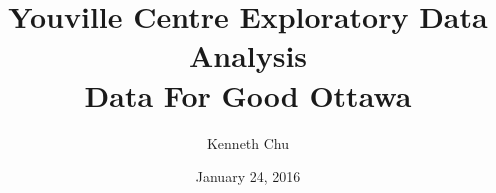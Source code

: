 \documentclass{beamer}
\title[Data for Good 2016-01-24]{
\mbox{}\vskip 2.0cm
\Huge\bf Youville Centre
\vskip 0.1cm
\huge Exploratory Data Analysis
\\ \vskip 0.3cm
\Large Data For Good Ottawa
}
\author{Kenneth Chu}
\institute[D4GO]{
}
\date{January 24, 2016} %
\begin{document}
\newcommand{\graphicsDir}{../../visualizeData/output.SNAPSHOT.2016-01-24.01}
\newcommand{\bigHeight}{7.0cm}
\newcommand{\bigWidth}{11.5cm}

\begin{frame}
\titlepage
\end{frame}



\end{document}

